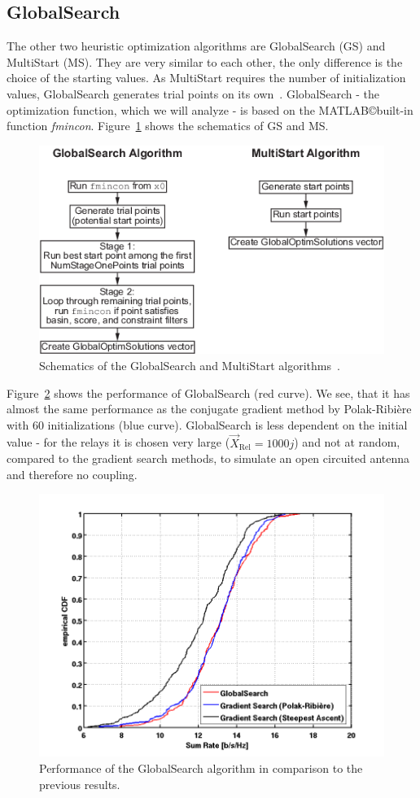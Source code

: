 \subsection{GlobalSearch}
\label{sec:globals}

The other two heuristic optimization algorithms are GlobalSearch (GS) and MultiStart (MS).
They are very similar to each other, the only difference is the choice of the starting values.
As MultiStart requires the number of initialization values, GlobalSearch generates trial points on its own~\cite{matlab:gloabls}.
GlobalSearch - the optimization function, which we will analyze - is based on the MATLAB\copyright  built-in function \textit{fmincon}.
Figure~\ref{fig:globals_scheme} shows the schematics of GS and MS.
\begin{figure}[h]
\centering
  \includegraphics[width=0.7\linewidth]{images/global_algorithm.png}
\caption{Schematics of the GlobalSearch and MultiStart algorithms~\cite{matlab:gloabls}.}
\label{fig:globals_scheme}
\end{figure}

Figure~\ref{fig:globals} shows the performance of GlobalSearch (red curve).
We see, that it has almost the same performance as the conjugate gradient method by Polak-Ribi\`{e}re with 60 initializations (blue curve).
GlobalSearch is less dependent on the initial value - for the relays it is chosen very large ($\vec{X}_{\text{Rel}} = 1000j$) and not at random, compared to the gradient search methods, to simulate an open circuited antenna and therefore no coupling.

\begin{figure}[h]
\centering
  \includegraphics[width=0.8\linewidth]{images/Globalscomparison_edited.png}
\caption{Performance of the GlobalSearch algorithm in comparison to the previous results.}
\label{fig:globals}
\end{figure}

